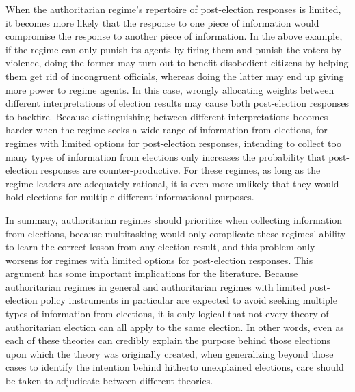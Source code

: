 \documentclass[12pt]{article}
\newcommand{\1}{\mathbbm{1}}
\begin{document}
When the authoritarian regime's repertoire of post-election responses is limited, it becomes more likely that the response to one piece of information would compromise the response to another piece of information. In the above example, if the regime can only punish its agents by firing them and punish the voters by violence, doing the former may turn out to benefit disobedient citizens by helping them get rid of incongruent officials, whereas doing the latter may end up giving more power to regime agents. In this case, wrongly allocating weights between different interpretations of election results may cause both post-election responses to backfire. Because distinguishing between different interpretations becomes harder when the regime seeks a wide range of information from elections, for regimes with limited options for post-election responses, intending to collect too many types of information from elections only increases the probability that post-election responses are counter-productive. For these regimes, as long as the regime leaders are adequately rational, it is even more unlikely that they would hold elections for multiple different informational purposes. 

In summary, authoritarian regimes should prioritize when collecting information from elections, because multitasking would only complicate these regimes' ability to learn the correct lesson from any election result, and this problem only worsens for regimes with limited options for post-election responses. This argument has some important implications for the literature. Because authoritarian regimes in general and authoritarian regimes with limited post-election policy instruments in particular are expected to avoid seeking multiple types of information from elections, it is only logical that not every theory of authoritarian election can all apply to the same election. In other words, even as each of these theories can credibly explain the purpose behind those elections upon which the theory was originally created, when generalizing beyond those cases to identify the intention behind hitherto unexplained elections, care should be taken to adjudicate between different theories. 
\end{document}
